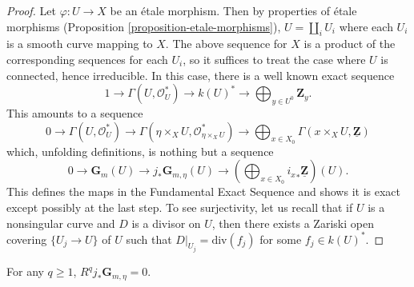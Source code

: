 \begin{proof}
Let $\varphi : U \to X$ be an \'etale morphism. Then by properties of
\'etale morphisms (Proposition \ref{proposition-etale-morphisms}),
$U = \coprod_i U_i$ where each $U_i$ is a smooth curve mapping to $X$.
The above sequence for $X$ is a product of the corresponding sequences
for each $U_i$, so it suffices to treat the case where $U$ is connected,
hence irreducible. In this case, there is a well known exact sequence
$$
1 \longrightarrow
\Gamma(U, \mathcal{O}_U^*) \longrightarrow
k(U)^* \longrightarrow \bigoplus\nolimits_{y \in U^0} \mathbf{Z}_y.
$$
This amounts to a sequence
$$
0 \longrightarrow \Gamma(U, \mathcal{O}_U^*) \longrightarrow
\Gamma(\eta \times_X U, \mathcal{O}_{\eta \times_X U}^*) \longrightarrow
\bigoplus\nolimits_{x \in X_0}
\Gamma(x \times_X U, \underline{\mathbf{Z}})
$$
which, unfolding definitions, is nothing but a sequence
$$
0 \longrightarrow \mathbf{G}_m(U) \longrightarrow
j_* \mathbf{G}_{m, \eta}(U) \longrightarrow
\left(\bigoplus\nolimits_{x \in X_0} {i_x}_* \underline{\mathbf{Z}}\right)(U).
$$
This defines the maps in the Fundamental Exact Sequence and shows it is exact
except possibly at the last step. To see surjectivity, let us recall that if
$U$ is a nonsingular curve and $D$ is a divisor on $U$,
then there exists a Zariski open covering $\{U_j \to U\}$ of $U$
such that $D|_{U_j} = \text{div}(f_j)$ for some $f_j \in k(U)^*$.
\end{proof}

\begin{lemma}
\label{lemma-higher-direct-jstar-Gm}
For any $q \geq 1$, $R^q j_*\mathbf{G}_{m, \eta} = 0$.
\end{lemma}


